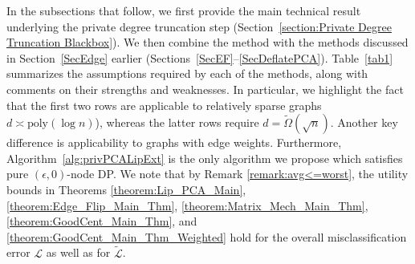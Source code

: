 \documentclass{article}
\newtheorem{remark}{Remark}
\begin{document}



In the subsections that follow, we first provide the main technical result underlying the private degree truncation step (Section~\ref{section:Private Degree Truncation Blackbox}). We then combine the method with the methods discussed in Section~\ref{SecEdge} earlier (Sections~\ref{SecEF}--\ref{SecDeflatePCA}). Table~\ref{tab1} summarizes the assumptions required by each of the methods, along with comments on their strengths and weaknesses. In particular, we highlight the fact that the first two rows are applicable to relatively sparse graphs $d \asymp \text{poly}(\log n)$), whereas the latter rows require $d = \widetilde{\Omega}(\sqrt{n})$. Another key difference is applicability to graphs with edge weights. Furthermore, Algorithm~\ref{alg:privPCALipExt} is the only algorithm we propose which satisfies pure $(\epsilon, 0)$-node DP.
We note that by Remark \ref{remark:avg<=worst}, the utility bounds in Theorems \ref{theorem:Lip_PCA_Main}, \ref{theorem:Edge_Flip_Main_Thm}, \ref{theorem:Matrix_Mech_Main_Thm}, \ref{theorem:GoodCent_Main_Thm}, and \ref{theorem:GoodCent_Main_Thm_Weighted} hold for the overall misclassification error $\mathcal{L}$ as well as for $\widetilde{\mathcal{L}}$.
\end{document}
